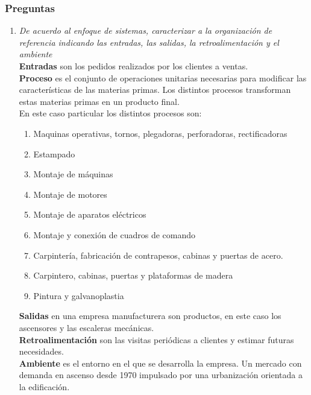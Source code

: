 \documentclass[a4paper,10pt]{article}
\begin{document}
\subsubsection{Preguntas}
			\begin{enumerate}
		
			\item \textit{ De acuerdo al enfoque de sistemas, caracterizar a la organización de referencia indicando las entradas, las salidas, la retroalimentación y el ambiente}\\

\textbf{Entradas} son los pedidos realizados por los clientes a ventas.\\

\textbf{Proceso} es el conjunto de operaciones unitarias necesarias para modificar las características de las materias primas. Los distintos procesos transforman estas materias primas en un producto final.\\
En este caso particular los distintos procesos son:
\begin{enumerate}
\item Maquinas operativas, tornos, plegadoras, perforadoras, rectificadoras
\item Estampado
\item Montaje de máquinas
\item Montaje de motores
\item Montaje de aparatos eléctricos
\item Montaje y conexión de cuadros de comando
\item Carpintería, fabricación de contrapesos, cabinas y puertas de acero.
\item Carpintero, cabinas, puertas y plataformas de madera
\item Pintura y galvanoplastia
\end{enumerate}
\textbf{Salidas} en una empresa manufacturera son productos, en este caso los ascensores y las escaleras mecánicas.\\

\textbf{Retroalimentación} son las visitas periódicas a clientes y estimar futuras necesidades.\\

\textbf{Ambiente} es el entorno en el que se desarrolla la empresa. Un mercado con demanda en ascenso desde 1970 impulsado por una urbanización orientada a la edificación.


\end{enumerate}
\end{document}
